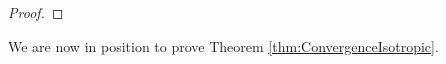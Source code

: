 \documentclass[11pt]{article}
\begin{document}
\begin{proof}
%

\end{proof}


We are now in position to prove Theorem  \ref{thm:ConvergenceIsotropic}.
\end{document}
